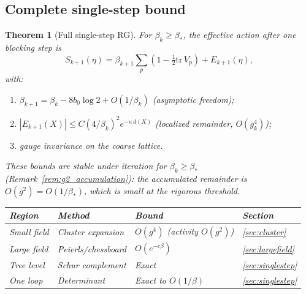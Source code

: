 \documentclass[11pt]{article}
\newtheorem{theorem}{Theorem}[section]
\theoremstyle{definition}
\newcommand{\tr}{\mathrm{tr}}
\begin{document}
\subsection{Complete single-step bound}

\begin{theorem}[Full single-step RG]\label{thm:singlestep}
For $\beta_k\ge\beta_*$, the effective action after one blocking step is
\begin{equation}
S_{k+1}(\eta)=\beta_{k+1}\sum_p(1-\tfrac{1}{2}\tr\,V_p)+E_{k+1}(\eta),
\end{equation}
with:
\begin{enumerate}[nosep,label=(\roman*)]
\item $\beta_{k+1}=\beta_k-8b_0\log 2+O(1/\beta_k)$
(asymptotic freedom);
\item $|E_{k+1}(X)|\le C(4/\beta_k)^2 e^{-\kappa\,d(X)}$
(localized remainder, $O(g_k^4)$);
\item gauge invariance on the coarse lattice.
\end{enumerate}
These bounds are stable under iteration for $\beta_k\ge\beta_*$
(Remark~\ref{rem:g2_accumulation}): the accumulated remainder
is $O(g^2)=O(1/\beta_*)$, which is small at the rigorous
threshold.

\begin{center}
\begin{tabular}{llll}
\toprule
\textbf{Region} & \textbf{Method} & \textbf{Bound} & \textbf{Section}\\
\midrule
Small field & Cluster expansion & $O(g^4)$ (activity $O(g^2)$) & \ref{sec:cluster}\\
Large field & Peierls/chessboard & $O(e^{-c\beta})$ &
\ref{sec:largefield}\\
Tree level & Schur complement & Exact & \ref{sec:singlestep}\\
One loop & Determinant & Exact to $O(1/\beta)$ & \ref{sec:singlestep}\\
\bottomrule
\end{tabular}
\end{center}
\end{theorem}
\end{document}
